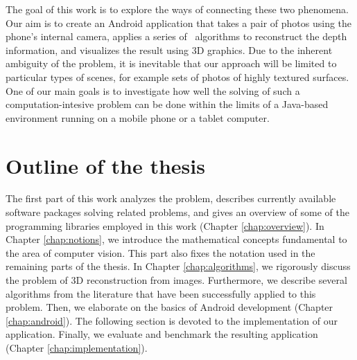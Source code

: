 The goal of this work is to explore the ways of connecting these two phenomena. 
Our aim is to create an Android application that takes a pair of photos using the phone's internal camera, applies a series of \cv\ algorithms to reconstruct the depth information, and visualizes the result using 3D graphics. %
Due to the inherent ambiguity of the problem, it is inevitable that our approach will be limited to particular types of scenes, for example sets of photos of highly textured surfaces. 
One of our main goals is to investigate how well the solving of such a computation-intesive problem can be done within the limits of a Java-based environment running on a mobile phone or a tablet computer.

\section*{Outline of the thesis}

The first part of this work analyzes the problem, describes currently available software packages solving related problems, and gives an overview of some of the programming libraries employed in this work (Chapter \ref{chap:overview}). 
In Chapter \ref{chap:notions}, we introduce the mathematical concepts fundamental to the area of computer vision. 
This part also fixes the notation used in the remaining parts of the thesis. 
In Chapter \ref{chap:algorithms}, we rigorously discuss the problem of 3D reconstruction from images. %
Furthermore, we describe several algorithms from the literature that have been successfully applied to this problem. 
Then, we elaborate on the basics of Android development (Chapter \ref{chap:android}).
The following section is devoted to the implementation of our application.
Finally, we evaluate and benchmark the resulting application (Chapter \ref{chap:implementation}).  %

